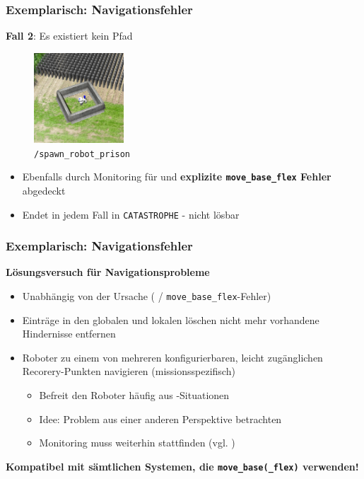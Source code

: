 \documentclass{beamer}
\newcommand{\code}[1]{\colorbox{light-gray}{\texttt{#1}}}
\begin{document}
\begin{frame}
  \frametitle{Exemplarisch: Navigationsfehler}
  \textbf{Fall 2}: Es existiert kein Pfad
  \begin{figure}[H]
    \centering
    \includegraphics[width=0.3\textwidth]{img/robot_prison.png}
    \caption*{\code{/spawn\_robot\_prison}}
  \end{figure}
  \begin{itemize}
    \item Ebenfalls durch Monitoring für \textbf{} und \textbf{explizite \code{move\_base\_flex} Fehler} abgedeckt
    \item Endet in jedem Fall in \code{CATASTROPHE} - nicht lösbar
  \end{itemize}
\end{frame}

\begin{frame}
  \frametitle{Exemplarisch: Navigationsfehler}
  \textbf{Lösungsversuch für Navigationsprobleme}
  \begin{itemize}
    \item Unabhängig von der Ursache ( / \code{move\_base\_flex}-Fehler)
    \item Einträge in den globalen und lokalen  löschen \textrightarrow \thinspace nicht mehr vorhandene Hindernisse entfernen
    \item Roboter zu einem von mehreren konfigurierbaren, leicht zugänglichen Recorery-Punkten navigieren (missionsspezifisch)
    \begin{itemize}
      \item Befreit den Roboter häufig aus -Situationen
      \item Idee: Problem aus einer anderen Perspektive betrachten
      \item Monitoring muss weiterhin stattfinden (vgl. )
    \end{itemize}
  \end{itemize}
  \textbf{Kompatibel mit sämtlichen Systemen, die \code{move\_base(\_flex)} verwenden!}
\end{frame}
\end{document}
